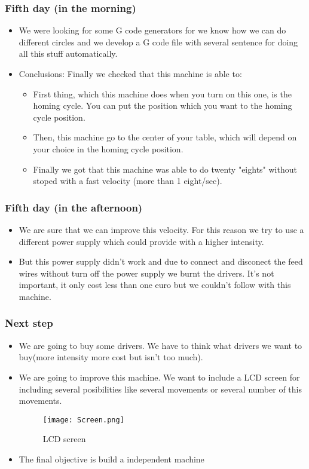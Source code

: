 \documentclass{beamer}
\begin{document}
\begin{frame}
\frametitle{Fifth day (in the morning)}
 
\begin{itemize}
\item{} We were looking for some G code generators for we know how we can do different circles and we develop a G code file with several sentence for doing all this stuff automatically.
\item{} Conclusions: Finally we checked that this machine is able to:
\begin{itemize}
\item {} First thing, which this machine does when you turn on this one, is the homing cycle. You can put the position which you want to the homing cycle position.
\item{} Then, this machine go to the center of your table, which will depend on your choice in the homing cycle position.
\item{} Finally we got that this machine was able to do twenty "eights" without stoped with a fast velocity (more than 1 eight/sec).
\end{itemize}
\end{itemize}
\end{frame}

\begin{frame}
\frametitle{Fifth day (in the afternoon)}
 
\begin{itemize}
\item{} We are sure that we can improve this velocity. For this reason we try to use a different power supply which could provide with a higher intensity.
\item{} But this power supply didn't work and due to connect and disconect the feed wires without turn off the power supply we burnt the drivers. It's not important, it only cost less than one euro but we couldn't follow with this machine.
\end{itemize}
\end{frame}

\begin{frame}
\frametitle{Next step}
  
\begin{itemize}
\item{} We are going to buy some drivers. We have to think what drivers we want to buy(more intensity more cost but isn't too much).

\item{} We are going to improve this machine. We want to include a LCD screen for including several posibilities like several movements or several number of this movements. 

\begin{figure}[hbtp]
\centering
\texttt{[image: Screen.png]}
\caption{LCD screen}
\end{figure}
\item{} The final objective is build a independent machine
\end{itemize}


\end{frame}
\end{document}
